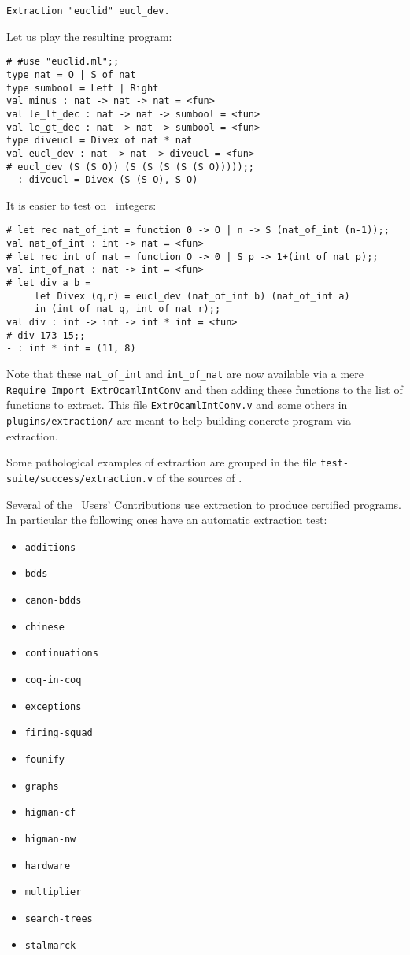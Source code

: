\begin{verbatim}
Extraction "euclid" eucl_dev.
\end{verbatim}

Let us play the resulting program:

\begin{verbatim}
# #use "euclid.ml";;
type nat = O | S of nat
type sumbool = Left | Right
val minus : nat -> nat -> nat = <fun>
val le_lt_dec : nat -> nat -> sumbool = <fun>
val le_gt_dec : nat -> nat -> sumbool = <fun>
type diveucl = Divex of nat * nat
val eucl_dev : nat -> nat -> diveucl = <fun>
# eucl_dev (S (S O)) (S (S (S (S (S O)))));;
- : diveucl = Divex (S (S O), S O)
\end{verbatim}
It is easier to test on \ocaml\ integers:
\begin{verbatim}
# let rec nat_of_int = function 0 -> O | n -> S (nat_of_int (n-1));;
val nat_of_int : int -> nat = <fun>
# let rec int_of_nat = function O -> 0 | S p -> 1+(int_of_nat p);;
val int_of_nat : nat -> int = <fun>
# let div a b = 
     let Divex (q,r) = eucl_dev (nat_of_int b) (nat_of_int a)
     in (int_of_nat q, int_of_nat r);;
val div : int -> int -> int * int = <fun>
# div 173 15;;
- : int * int = (11, 8)
\end{verbatim}

Note that these {\tt nat\_of\_int} and {\tt int\_of\_nat} are now
available via a mere {\tt Require Import ExtrOcamlIntConv} and then
adding these functions to the list of functions to extract. This file
{\tt ExtrOcamlIntConv.v} and some others in {\tt plugins/extraction/}
are meant to help building concrete program via extraction.


Some pathological examples of extraction are grouped in the file
{\tt test-suite/success/extraction.v} of the sources of \Coq.


Several of the \Coq\ Users' Contributions use extraction to produce
certified programs. In particular the following ones have an automatic
extraction test:

\begin{itemize}
\item {\tt additions}
\item {\tt bdds}
\item {\tt canon-bdds}
\item {\tt chinese}
\item {\tt continuations}
\item {\tt coq-in-coq}
\item {\tt exceptions}
\item {\tt firing-squad}
\item {\tt founify}
\item {\tt graphs}
\item {\tt higman-cf}
\item {\tt higman-nw}
\item {\tt hardware}
\item {\tt multiplier}
\item {\tt search-trees}
\item {\tt stalmarck}
\end{itemize}

